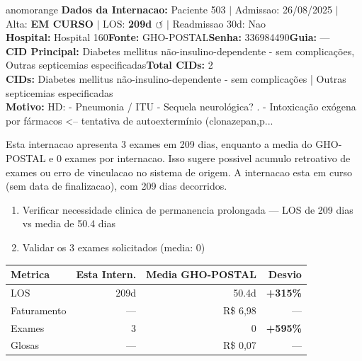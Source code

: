 \documentclass[a4paper,10pt]{article}
\begin{document}
\begin{anomalycard}[Internacao 59 | GHO-POSTAL | ALTO (z=4.69)]{anomorange}
\textbf{Dados da Internacao:} Paciente 503 $\mid$ Admissao: 26/08/2025 $\mid$ Alta: \textcolor{anomorange}{\textbf{EM CURSO}} $\mid$ LOS: \textbf{209d \textcolor{anomorange}{$\circlearrowleft$}} $\mid$ Readmissao 30d: Nao\\
\textbf{Hospital:} Hospital 160\quad\textbf{Fonte:} GHO-POSTAL\quad\textbf{Senha:} 336984490\quad\textbf{Guia:} ---\\
\textbf{CID Principal:} {\small Diabetes mellitus não-insulino-dependente - sem complicações, Outras septicemias especificadas}\quad\textbf{Total CIDs:} 2\\

\textbf{CIDs:} {\scriptsize Diabetes mellitus não-insulino-dependente - sem complicações | Outras septicemias especificadas}\\

\textbf{Motivo:} {\scriptsize HD: - Pneumonia / ITU - Sequela neurológica? . - Intoxicação exógena por fármacos <-- tentativa de autoextermínio (clonazepan,p...}\\

\vspace{2pt}\begin{tcolorbox}[colback=severityred!20,colframe=anomorange,title={\textbf{Interpretacao de Negocio}},fonttitle=\bfseries\small,left=4pt,right=4pt,top=3pt,bottom=3pt]
{\small Esta internacao apresenta 3 exames em 209 dias, enquanto a media do GHO-POSTAL e 0 exames por internacao. Isso sugere possivel acumulo retroativo de exames ou erro de vinculacao no sistema de origem. A internacao esta em curso (sem data de finalizacao), com 209 dias decorridos.}
\end{tcolorbox}
\begin{tcolorbox}[colback=severityyellow!30,colframe=anomorange,title={\textbf{Recomendacoes Especificas}},fonttitle=\bfseries\small,left=4pt,right=4pt,top=3pt,bottom=3pt]
\begin{enumerate}[nosep,leftmargin=16pt]
\item {\small Verificar necessidade clinica de permanencia prolongada --- LOS de 209 dias vs media de 50.4 dias}
\item {\small Validar os 3 exames solicitados (media: 0)}
\end{enumerate}
\end{tcolorbox}
\begin{center}\begin{tabular}{l r r r}\toprule\textbf{Metrica} & \textbf{Esta Intern.} & \textbf{Media GHO-POSTAL} & \textbf{Desvio} \\\midrule
LOS & 209d & 50.4d & \textcolor{anomred}{\textbf{+315\%}} \\
Faturamento & --- & R\$ 6,98 & --- \\
Exames & 3 & 0 & \textcolor{anomred}{\textbf{+595\%}} \\
Glosas & --- & R\$ 0,07 & --- \\
\bottomrule\end{tabular}\end{center}


\end{anomalycard}
\end{document}
